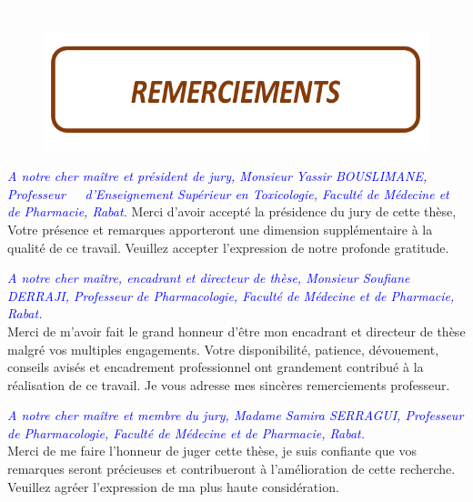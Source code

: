 \pagebreak

\begin{itemize}
  \item[\textcolor{white}{$\Box$}] 
\end{itemize}


\vspace{7cm}

\begin{figure}[H]
  \includegraphics{Images/remerciement.png}
\end{figure}

\pagebreak


\noindent\emph{\textcolor{blue}{A notre cher maître et président de jury, Monsieur Yassir BOUSLIMANE, Professeur  \,\,\,\,\, d'Enseignement Supérieur en Toxicologie, Faculté de Médecine et de Pharmacie, Rabat.}}
Merci d'avoir accepté la présidence du jury de cette thèse, Votre présence et remarques apporteront une dimension supplémentaire à la qualité de ce travail. Veuillez accepter l'expression de notre profonde gratitude. \vspace*{1em}

\noindent\emph{\textcolor{blue}{A notre cher maître, encadrant et directeur de thèse, Monsieur Soufiane DERRAJI, Professeur de Pharmacologie, Faculté de Médecine et de Pharmacie, Rabat.}}\\  
Merci de m'avoir fait le grand honneur d'être mon encadrant et directeur de thèse malgré vos multiples engagements. Votre disponibilité, patience, dévouement, conseils avisés et encadrement professionnel ont grandement contribué à la réalisation de ce travail. Je vous adresse mes sincères remerciements professeur. \vspace*{1em}

\noindent\emph{\textcolor{blue}{A notre cher maître et membre du jury, Madame Samira SERRAGUI, Professeur de Pharmacologie, Faculté de Médecine et de Pharmacie, Rabat. }}\\
Merci de me faire l'honneur de juger cette thèse, je suis confiante que vos remarques seront précieuses et contribueront à l'amélioration de cette recherche. Veuillez agréer l'expression de ma plus haute considération. \vspace*{1em}


